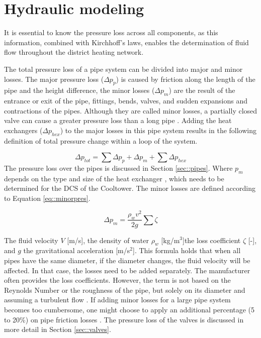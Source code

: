 \section{Hydraulic modeling}
It is essential to know the pressure loss across all components, as this information, combined with Kirchhoff's laws, enables the determination of fluid flow throughout the district heating network. 

The total pressure loss of a pipe system can be divided into major and minor losses. The major pressure loss ($\Delta p_p$) is caused by friction along the length of the pipe and the height difference, the minor losses ($\Delta p_m$) are the result of the entrance or exit of the pipe, fittings, bends, valves, and sudden expansions and contractions of the pipes. Although they are called minor losses, a partially closed valve can cause a greater pressure loss than a long pipe \cite{white2011fluid}. Adding the heat exchangers ($\Delta p_{hex}$) to the major losses in this pipe system results in the following definition of total pressure change within a loop of the system. 

\begin{equation}
    \Delta p_{tot} = \sum \Delta p_{p} + \Delta p_m + \sum \Delta p_{hex} 
\end{equation}
The pressure loss over the pipes is discussed in Section \ref{sec::pipes}. Where $p_m$ depends on the type and size of the heat exchanger \cite{YvoPutter}, which needs to be determined for the DCS of the Cooltower. The minor losses are defined according to Equation \ref{eq::minorpres}.

\begin{equation}\label{eq::minorpres}
    \Delta p_m = \frac{\rho_w v^2}{2g} \sum \zeta
\end{equation}

The fluid velocity $V$ [m/s], the density of water $\rho_w$ [kg/m$^3$]the loss coefficient $\zeta$ [-], and $g$ the gravitational acceleration [m/s$^2$]. This formula holds that when all pipes have the same diameter, if the diameter changes, the fluid velocity will be affected. In that case, the losses need to be added separately. The manufacturer often provides the loss coefficients. However, the term is not based on the Reynolds Number or the roughness of the pipe, but solely on its diameter and assuming a turbulent flow \cite{white2011fluid}. If adding minor losses for a large pipe system becomes too cumbersome, one might choose to apply an additional percentage (5 to 20\%) on pipe friction losses \cite{echtephdthesis}. The pressure loss of the valves is discussed in more detail in Section \ref{sec::valves}.

